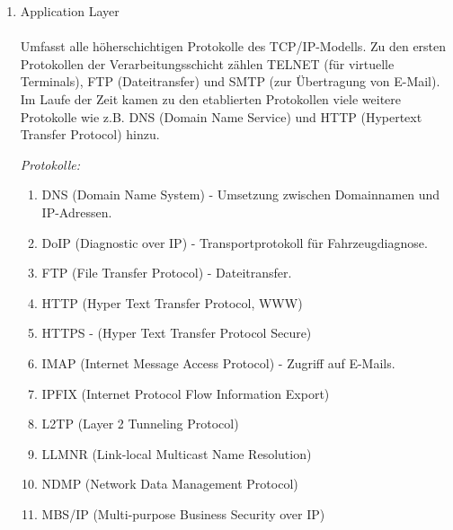 \documentclass[11pt]{article}
\begin{document}
    \begin{enumerate}[\thesection .1]
        \item{Application Layer}\\\\
        Umfasst alle höherschichtigen Protokolle des TCP/IP-Modells.
        Zu den ersten Protokollen der Verarbeitungsschicht zählen TELNET (für virtuelle Terminals),
        FTP (Dateitransfer) und SMTP (zur Übertragung von E-Mail).
        Im Laufe der Zeit kamen zu den etablierten Protokollen viele weitere Protokolle wie z.B.
        DNS (Domain Name Service) und HTTP (Hypertext Transfer Protocol) hinzu.\\

        \begin{addmargin}[1em]{1em}
            \emph{Protokolle:}
            \begin{enumerate}[$\diamond$]
                \item DNS (Domain Name System) - Umsetzung zwischen Domainnamen und IP-Adressen.\\
                \item DoIP (Diagnostic over IP) - Transportprotokoll für Fahrzeugdiagnose.\\
                \item FTP (File Transfer Protocol) - Dateitransfer.\\
                \item HTTP (Hyper Text Transfer Protocol, WWW)\\
                \item HTTPS - (Hyper Text Transfer Protocol Secure)\\
                \item IMAP (Internet Message Access Protocol) - Zugriff auf E-Mails.\\
                \item IPFIX (Internet Protocol Flow Information Export)\\
                \item L2TP (Layer 2 Tunneling Protocol)\\
                \item LLMNR (Link-local Multicast Name Resolution)\\
                \item NDMP (Network Data Management Protocol)\\
                \item MBS/IP (Multi-purpose Business Security over IP)\\

\end{enumerate}
\end{addmargin}
\end{enumerate}
\end{document}
